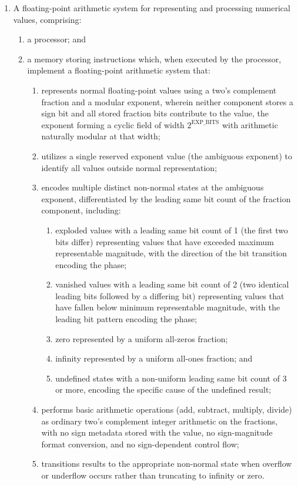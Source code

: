\documentclass[12pt,letter]{article}
\begin{document}
\begin{enumerate}
    \item\label{cl:scalar-system} A floating-point arithmetic system for representing and processing numerical values, comprising:
    \begin{enumerate}
        \item a processor; and
        \item a memory storing instructions which, when executed by the processor, implement a floating-point arithmetic system that:
              \begin{enumerate}
                  \item represents normal floating-point values using a two's complement fraction and a modular exponent, wherein neither component stores a sign bit and all stored fraction bits contribute to the value, the exponent forming a cyclic field of width $2^{\text{EXP\_BITS}}$ with arithmetic naturally modular at that width;
                  \item utilizes a single reserved exponent value (the ambiguous exponent) to identify all values outside normal representation;
                  \item encodes multiple distinct non-normal states at the ambiguous exponent, differentiated by the leading same bit count of the fraction component, including:
                        \begin{enumerate}
                            \item exploded values with a leading same bit count of 1 (the first two bits differ) representing values that have exceeded maximum representable magnitude, with the direction of the bit transition encoding the phase;
                            \item vanished values with a leading same bit count of 2 (two identical leading bits followed by a differing bit) representing values that have fallen below minimum representable magnitude, with the leading bit pattern encoding the phase;
                            \item zero represented by a uniform all-zeros fraction;
                            \item infinity represented by a uniform all-ones fraction; and
                            \item undefined states with a non-uniform leading same bit count of 3 or more, encoding the specific cause of the undefined result;
                        \end{enumerate}
                  \item performs basic arithmetic operations (add, subtract, multiply, divide) as ordinary two's complement integer arithmetic on the fractions, with no sign metadata stored with the value, no sign-magnitude format conversion, and no sign-dependent control flow;
                  \item transitions results to the appropriate non-normal state when overflow or underflow occurs rather than truncating to infinity or zero.
              \end{enumerate}
    \end{enumerate}


\end{enumerate}
\end{document}
